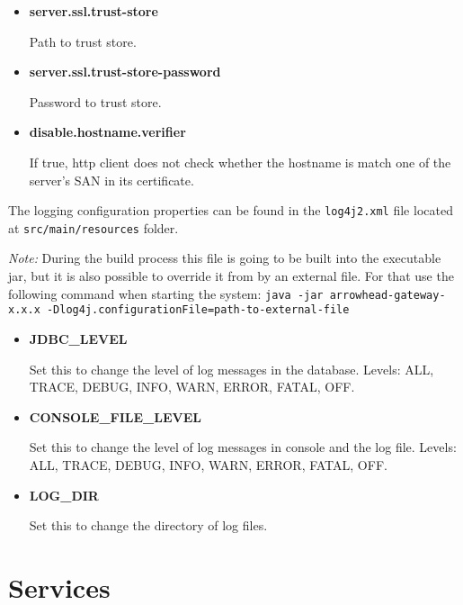 \documentclass[a4paper]{arrowhead}
\begin{document}
\begin{itemize}
  \item \textbf{server.ssl.trust-store}
  
  Path to trust store.
  
  \item \textbf{server.ssl.trust-store-password}
  
  Password to trust store.
  
  \item \textbf{disable.hostname.verifier}
  
  If true, http client does not check whether the hostname is match one of the server's SAN in its certificate.
  \end{itemize}
  
The logging configuration properties can be found in the \texttt{log4j2.xml} file located at \texttt{src/main/resources} folder.

\textit{Note:} During the build process this file is going to be built into the executable jar, but it is also possible to override it from by an external file. For that use the following command when starting the system: \texttt{java -jar arrowhead-gateway-x.x.x -Dlog4j.configurationFile={path-to-external-file}}

\begin{itemize}
    \item \textbf{JDBC\_LEVEL}
    
    Set this to change the level of log messages in the database. Levels: ALL, TRACE, DEBUG, INFO, WARN, ERROR, FATAL, OFF.
    
    \item \textbf{CONSOLE\_FILE\_LEVEL}
    
    Set this to change the level of log messages in console and the log file. Levels: ALL, TRACE, DEBUG, INFO, WARN, ERROR, FATAL, OFF.
    
    \item \textbf{LOG\_DIR}
    
    Set this to change the directory of log files.
\end{itemize}
  
\newpage

\section{Services}
\label{sec:services}
\end{document}
